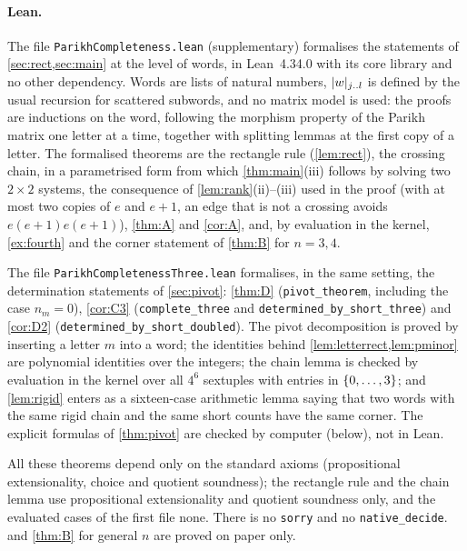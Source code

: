 \documentclass[11pt,a4paper]{article}
\begin{document}
\paragraph{Lean.} The file \texttt{ParikhCompleteness.lean} (supplementary) formalises the statements of \cref{sec:rect,sec:main} at the level of words, in Lean~4.34.0 with its core library and no other dependency. Words are lists of natural numbers, $\lvert w\rvert_{j\mathinner{\ldotp\ldotp} l}$ is defined by the usual recursion for scattered subwords, and no matrix model is used: the proofs are inductions on the word, following the morphism property of the Parikh matrix one letter at a time, together with splitting lemmas at the first copy of a letter. The formalised theorems are the rectangle rule (\cref{lem:rect}), the crossing chain, in a parametrised form from which \cref{thm:main}(iii) follows by solving two $2\times2$ systems, the consequence of \cref{lem:rank}(ii)--(iii) used in the proof (with at most two copies of $e$ and $e+1$, an edge that is not a crossing avoids $e(e+1)e(e+1)$), \cref{thm:A} and \cref{cor:A}, and, by evaluation in the kernel, \cref{ex:fourth} and the corner statement of \cref{thm:B} for $n=3,4$.

The file \texttt{ParikhCompletenessThree.lean} formalises, in the same setting, the determination statements of \cref{sec:pivot}: \cref{thm:D} (\texttt{pivot\_theorem}, including the case $n_m=0$), \cref{cor:C3} (\texttt{complete\_three} and \texttt{determined\_by\_short\_three}) and \cref{cor:D2} (\texttt{determined\_by\_short\_doubled}). The pivot decomposition is proved by inserting a letter $m$ into a word; the identities behind \cref{lem:letterrect,lem:pminor} are polynomial identities over the integers; the chain lemma is checked by evaluation in the kernel over all $4^6$ sextuples with entries in $\{0,\ldots,3\}$; and \cref{lem:rigid} enters as a sixteen-case arithmetic lemma saying that two words with the same rigid chain and the same short counts have the same corner. The explicit formulas of \cref{thm:pivot} are checked by computer (below), not in Lean.

All these theorems depend only on the standard axioms (propositional extensionality, choice and quotient soundness); the rectangle rule and the chain lemma use propositional extensionality and quotient soundness only, and the evaluated cases of the first file none. There is no \texttt{sorry} and no \texttt{native\_decide}.  and \cref{thm:B} for general $n$ are proved on paper only.
\end{document}
